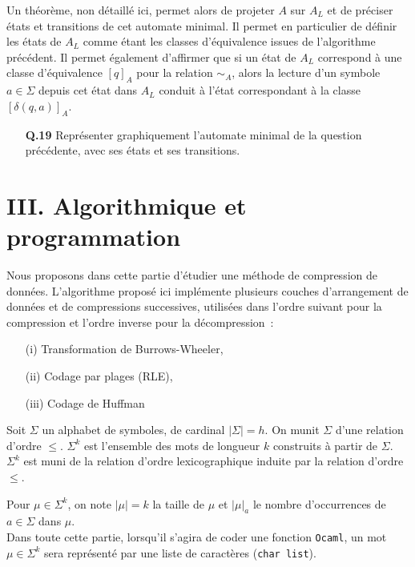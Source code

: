 \documentclass[11pt,a4paper]{article}\nofiles
\begin{document}
Un th\'eor\`eme, non d\'etaill\'e ici, permet alors de projeter $A$ sur $A_L$ et de pr\'eciser \'etats et transitions de cet automate minimal. 
Il permet en particulier de d\'efinir les \'etats de $A_L$ comme \'etant les classes d'\'equivalence issues de l'algorithme pr\'ec\'edent. 
Il permet \'egalement d'affirmer que si un \'etat de $A_L$ correspond \`a une classe d'\'equivalence $[q]_A$ pour la relation $\sim_A$, alors la lecture d'un symbole $a\in \Sigma$ depuis cet \'etat dans $A_L$ conduit \`a l'\'etat correspondant \`a la classe $[\delta(q,a)]_A$.
\begin{enumerate}
\item[{\bf Q.19}] Repr\'esenter graphiquement l'automate minimal de la question pr\'ec\'edente, avec ses \'etats et ses transitions.
\end{enumerate}


\section*{III. Algorithmique et programmation}
Nous proposons dans cette partie d'\'etudier une m\'ethode de compression de donn\'ees. 
L'algorithme propos\'e ici impl\'emente plusieurs couches d'arrangement de donn\'ees et de compressions successives, utilis\'ees dans l'ordre suivant pour la compression et l'ordre inverse pour la d\'ecompression~:
\begin{itemize}
\item[(i)] Transformation de Burrows-Wheeler,
\item[(ii)] Codage par plages (RLE),
\item[(iii)] Codage de Huffman
\end{itemize}

Soit $\Sigma$ un alphabet de symboles, de cardinal $|\Sigma|=h$. 
On munit $\Sigma$ d'une relation d'ordre $\leq$. 
$\Sigma^k$ est l'ensemble des mots de longueur $k$ construits \`a partir de $\Sigma$. 
$\Sigma^k$ est muni de la relation d'ordre lexicographique induite par la relation d'ordre $\leq$.

Pour $\mu\in \Sigma^k$, on note $|\mu|=k$ la taille de $\mu$ et $|\mu|_a$ le nombre d'occurrences de $a\in \Sigma$ dans $\mu$.\\

Dans toute cette partie, lorsqu'il s'agira de coder une fonction \texttt{Ocaml}, un mot $\mu \in \Sigma^k$ sera repr\'esent\'e par une liste de caract\`eres (\texttt{char list}).\\
\end{document}
